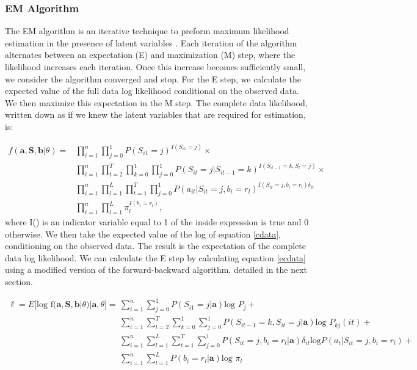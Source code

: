 \documentclass{article}
\begin{document}
\subsubsection{EM Algorithm}

The EM algorithm is an iterative technique to preform maximum likelihood estimation in the presence of latent variables \cite{Baum1970}. Each iteration of the algorithm alternates between an expectation (E) and maximization (M) step, where the likelihood increases each iteration. Once this increase becomes sufficiently small, we consider the algorithm converged and stop. For the E step, we calculate the expected value of the full data log likelihood conditional on the observed data. We then maximize this expectation in the M step. The complete data likelihood, written down as if we knew the latent variables that are required for estimation, is: 

\begin{equation}\label{cdata}
\begin{split}
    f(\textbf{a},\textbf{S}, \textbf{b} | \theta)  = & \prod_{i=1}^n \prod_{j=0}^1 
        P(S_{i1}=j)^{I(S_{i1}=j)} \times \\
    & \prod_{i=1}^n \prod^T_{t=2} \prod_{k=0}^1 \prod_{j=0}^1  
        P(S_{it}=j|S_{it-1}=k)^{I(S_{it-1}=k,S_{t}=j)} \times \\ 
    & \prod_{i=1}^n\prod_{l=1}^L \prod^T_{t=1}\prod_{j=0}^1 
        P(a_{it}|S_{it}=j,b_i=r_l)^{I(S_{it}=j,b_i=r_l)\delta_{it}}\\
    & \prod_{i=1}^n\prod_{l=1}^L \pi_l^{I(b_i=r_l)},
\end{split}
\end{equation}
where I() is an indicator variable equal to 1 of the inside expression is true and 0 otherwise. We then take the expected value of the log of equation \ref{cdata}, conditioning on the observed data. The result is the expectation of the complete data log likelihood. We can calculate the E step by calculating equation \ref{ecdata} using a modified version of the forward-backward algorithm, detailed in the next section.

\begin{equation}\label{ecdata}
\begin{split}
    \ell = E\big[\text{log f}(\textbf{a},\textbf{S}, \textbf{b} | \theta) | \textbf{a},\theta\big]  = 
        & \sum_{i=1}^n\sum_{j=0}^1P(S_{i1}=j|\textbf{a})\text{log }P_j + \\
    & \sum_{i=1}^n \sum^T_{t=2} \sum_{k=0}^1 \sum_{j=0}^1 
        P(S_{it-1}=k,S_{it}=j|\textbf{a})\text{log }P_{kj}(it) + \\ 
    & \sum_{i=1}^n \sum_{l=1}^L \sum^T_{t=1}\sum_{j=0}^1 
        P(S_{it}=j,b_i=r_l|\textbf{a}) \delta_{it}\text{log}P(a_{t}|S_{it}=j, b_i=r_l) + \\
    &  \sum_{i=1}^n \sum_{l=1}^L P(b_i=r_l|\textbf{a}) \text{log }\pi_l 
\end{split}
\end{equation}
\end{document}
